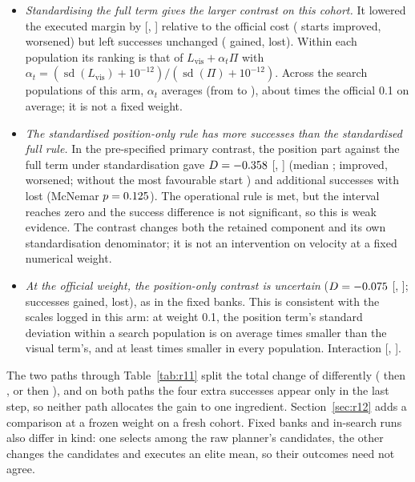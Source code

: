 \begin{itemize}[leftmargin=*,itemsep=1pt]
\item \emph{Standardising the full term gives the larger contrast on this cohort.} It lowered the executed margin by
  \RElScaleFull{} [\RElScaleFullLo, \RElScaleFullHi] relative to the official cost (\RElScaleFullImp{} starts improved,
  \RElScaleFullWor{} worsened) but left successes unchanged (\RElScaleFullGain{} gained, \RElScaleFullLoss{} lost).
  Within each population its ranking is that of $L_{\mathrm{vis}}+\alpha_t\Pi$ with
  $\alpha_t=(\operatorname{sd}(L_{\mathrm{vis}})+10^{-12})/(\operatorname{sd}(\Pi)+10^{-12})$. Across the \RElNPop{}
  search populations of this arm, $\alpha_t$ averages \RElAlphaFull{} (from \RElAlphaFullMin{} to \RElAlphaFullMax),
  about \RElEffFold{} times the official 0.1 on average; it is not a fixed weight.
\item \emph{The standardised position-only rule has \RElGain{} more successes than the standardised full rule.} In the
  pre-specified primary contrast, the position part against the full term under standardisation
  gave $D=-0.358$ [\RElDLo, \RElDHi] (median \RElMedian; \RElImp{} improved, \RElWor{} worsened; without the most
  favourable start \RElDexcl) and \RElGain{} additional successes with \RElLoss{} lost (McNemar $p=0.125$). The operational
  rule is met, but the interval reaches zero and the success difference is not significant, so this is weak evidence.
  The contrast changes both the retained component and its own standardisation denominator; it is not an intervention
  on velocity at a fixed numerical weight.
\item \emph{At the official weight, the position-only contrast is uncertain} ($D=-0.075$ [\RElSecDLo,
  \RElSecDHi]; successes \RElSecGain{} gained, \RElSecLoss{} lost), as in the fixed banks. This is consistent with the
  scales logged in this arm: at weight 0.1, the position term's standard deviation within a search population is on
  average \RElVOnePosRatio{} times smaller than the visual term's, and at least \RElVOnePosRatioMin{} times smaller in
  every population. Interaction \RElInter{} [\RElInterLo, \RElInterHi].
\end{itemize}
The two paths through Table~\ref{tab:r11} split the total change of \RNineVZD{} differently (\RElScaleFull{} then
\RElD, or \RElSecD{} then \RElScalePos), and on both paths the four extra successes appear only in the last step, so
neither path allocates the gain to one ingredient. Section~\ref{sec:r12} adds a comparison at a frozen weight on a fresh
cohort. Fixed banks and in-search runs also differ in kind: one selects among the raw planner's candidates, the other
changes the candidates and executes an elite mean, so their outcomes need not agree.

